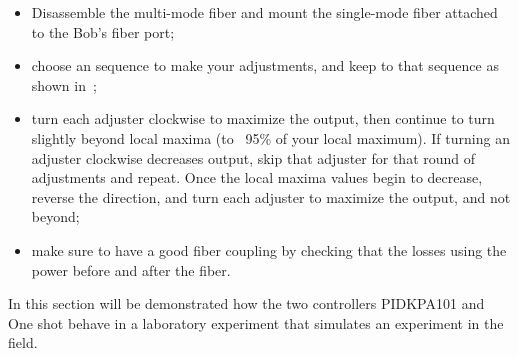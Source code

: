 \begin{itemize}
  \item Disassemble the multi-mode fiber and mount the single-mode fiber attached to the Bob's fiber port;
  \item choose an sequence to make your adjustments, and keep to that sequence as shown in~;
  \item turn each adjuster clockwise to maximize the output, then continue to turn slightly beyond local maxima (to ~95\% of your local maximum). If turning an adjuster clockwise decreases output, skip that adjuster for that round of adjustments and repeat. Once the local maxima values begin to decrease, reverse the direction, and turn each adjuster to maximize the output, and not beyond;
  \item make sure to have a good fiber coupling by checking that the losses using the power before and after the fiber.
\end{itemize}


In this section will be demonstrated how the two controllers PIDKPA101 and One shot behave in a laboratory experiment that simulates an experiment in the field.

